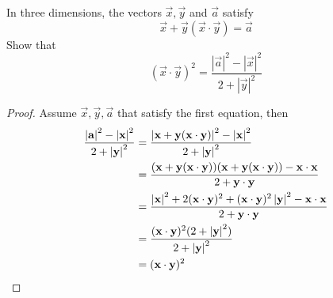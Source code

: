 \documentclass[12pt]{article}
\begin{document}
    \begin{question}
        In three dimensions, the vectors $\vec{x},\vec{y}$ and $\vec{a}$ satisfy
        \[
        \vec{x} + \vec{y}(\vec{x}\cdot\vec{y}) = \vec{a}
        \]
        Show that
        \[
            (\vec{x}\cdot\vec{y})^{2} = \frac{|\vec{a}|^{2}-|\vec{x}|^{2}}{2+|\vec{y}|^{2}}
        \]
    \end{question}
    \begin{proof}
        Assume $\vec{x},\vec{y},\vec{a}$ that satisfy the first equation, then
        \begin{align*}
            \frac{\left\lvert \mathbf{a} \right\rvert^{2}-\left\lvert \mathbf{x} \right\rvert^{2}}{2+\left\lvert \mathbf{y} \right\rvert^{2}}
            &= \frac{\left\lvert \mathbf{x}+\mathbf{y}(\mathbf{x}\cdot\mathbf{y}) \right\rvert^{2}-\left\lvert \mathbf{x} \right\rvert^{2}}{2+\left\lvert \mathbf{y} \right\rvert^{2}}\\
            &= \frac{(\mathbf{x}+\mathbf{y}(\mathbf{x}\cdot\mathbf{y}))(\mathbf{x}+\mathbf{y}(\mathbf{x}\cdot\mathbf{y}))-\mathbf{x}\cdot\mathbf{x}}
            {2+\mathbf{y}\cdot\mathbf{y}}\\
            &= \frac{\left\lvert \mathbf{x} \right\rvert^{2}+2(\mathbf{x}\cdot\mathbf{y})^{2}+(\mathbf{x}\cdot\mathbf{y})^{2}\left\lvert \mathbf{y} \right\rvert^{2}-\mathbf{x}\cdot\mathbf{x}}
            {2+\mathbf{y}\cdot\mathbf{y}}\\
            &= \frac{(\mathbf{x}\cdot\mathbf{y})^{2}(2+\left\lvert \mathbf{y} \right\rvert^{2})}
            {2+\left\lvert \mathbf{y} \right\rvert^{2}}\\
            &= (\mathbf{x}\cdot\mathbf{y})^{2}
        \end{align*}
    \end{proof}
\end{document}
